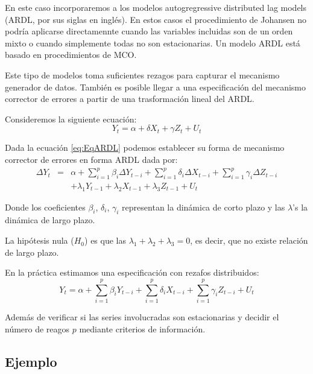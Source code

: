 \documentclass[
]{book}
\begin{document}
En este caso incorporaremos a los modelos autogregressive distributed lag models (ARDL, por sus siglas en inglés). En estos casos el procedimiento de Johansen no podría aplicarse directamennte cuando las variables incluidas son de un orden mixto o cuando simplemente todas no son estacionarias. Un modelo ARDL está basado en procedimientos de MCO.

Este tipo de modelos toma suficientes rezagos para capturar el mecanismo generador de datos. También es posible llegar a una especificación del mecanismo corrector de errores a partir de una trasformación lineal del ARDL.

Consideremos la siguiente ecuación:
\begin{equation}
    Y_t = \alpha + \delta X_t + \gamma Z_t + U_t
    \label{eq:EqARDL}
\end{equation}

Dada la ecuación \eqref{eq:EqARDL} podemos establecer su forma de mecanismo corrector de errores en forma ARDL dada por:
\begin{eqnarray*}
    \Delta Y_t & = & \alpha + \sum_{i = 1}^p \beta_i \Delta Y_{t-i} + \sum_{i = 1}^p \delta_i \Delta X_{t-i} + \sum_{i = 1}^p \gamma_i \Delta Z_{t-i} \\ 
    &  & + \lambda_1 Y_{t-1} + \lambda_2 X_{t-1} + \lambda_3 Z_{t-1} + U_t
\end{eqnarray*}

Donde los coeficientes \(\beta_i\), \(\delta_i\), \(\gamma_i\) representan la dinámica de corto plazo y las \(\lambda\)'s la dinámica de largo plazo.

La hipótesis nula (\(H_0\)) es que las \(\lambda_1 + \lambda_2 + \lambda_3 = 0\), es decir, que no existe relación de largo plazo.

En la práctica estimamos una especificación con rezafos distribuidos:
\begin{equation}
    Y_t = \alpha + \sum_{i = 1}^p \beta_i Y_{t-i} + \sum_{i = 1}^p \delta_i X_{t-i} + \sum_{i = 1}^p \gamma_i Z_{t-i} + U_t
\end{equation}

Además de verificar si las series involucradas son estacionarias y decidir el número de reagos \(p\) mediante criterios de información.

\hypertarget{ejemplo}{%
\subsection{Ejemplo}\label{ejemplo}}
\end{document}

